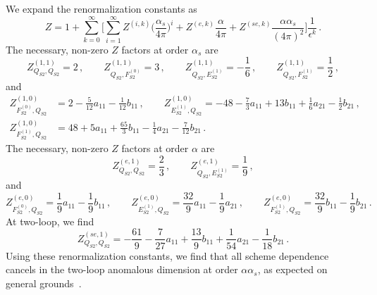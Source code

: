 \documentclass[letter,11pt,DIV=12,abstract=true,numbers=noenddot,titlepage=false,twocolumn=false,draft=false]{scrartcl}
\begin{document}
We expand the renormalization constants as
\begin{equation}
Z = 1 + \sum_{k=0}^\infty
\Bigg[ \sum_{i=1}^\infty Z^{(i,k)}
\bigg(\frac{\alpha_s}{4\pi}\bigg)^i
+ Z^{(e,k)} \frac{\alpha}{4\pi}
+ Z^{(se,k)} \frac{\alpha\alpha_s}{(4\pi)^2} \Bigg]
\frac{1}{\epsilon^k} \,.
\end{equation}
The necessary, non-zero $Z$ factors at order $\alpha_s$ are
\begin{equation}
Z_{Q_{S2}, Q_{S2}}^{(1,1)} = 2\,, \qquad
Z_{Q_{S2}, F_{S2}^{(0)}}^{(1,1)} = 3\,, \qquad
Z_{Q_{S2}, E_{S2}^{(1)}}^{(1,1)} = -\frac{1}{6}\,, \qquad
Z_{Q_{S2}, F_{S2}^{(1)}}^{(1,1)} = \frac{1}{2}\,,
\end{equation}
and
\begin{equation}
\begin{split}
Z_{F_{S2}^{(0)}, Q_{S2}}^{(1,0)} & = 2 - \frac{5}{12} a_{11} - \frac{1}{12} b_{11} \,, \qquad
Z_{E_{S2}^{(1)}, Q_{S2}}^{(1,0)} = - 48 - \frac{7}{3} a_{11} + 13 b_{11}
                                 + \frac{1}{6} a_{21} - \frac{1}{2} b_{21} \,, \\
Z_{F_{S2}^{(1)}, Q_{S2}}^{(1,0)} & = 48 + 5 a_{11} + \frac{65}{3} b_{11}
                                 - \frac{1}{4} a_{21} - \frac{7}{12} b_{21} \,.
\end{split}
\end{equation}
The necessary, non-zero $Z$ factors at order $\alpha$ are
\begin{equation}
Z_{Q_{S2}, Q_{S2}}^{(e,1)} = \frac{2}{3}\,, \qquad
Z_{Q_{S2}, E_{S2}^{(1)}}^{(e,1)} = \frac{1}{9}\,,
\end{equation}
and
\begin{equation}
Z_{F_{S2}^{(0)}, Q_{S2}}^{(e,0)} = \frac{1}{9} a_{11} - \frac{1}{9} b_{11} \,, \qquad
Z_{E_{S2}^{(1)}, Q_{S2}}^{(e,0)} = \frac{32}{9} a_{11} - \frac{1}{9} a_{21} \,, \qquad
Z_{F_{S2}^{(1)}, Q_{S2}}^{(e,0)} = \frac{32}{9} b_{11} - \frac{1}{9} b_{21} \,.
\end{equation}
At two-loop, we find
\begin{equation}
Z_{Q_{S2}, Q_{S2}}^{(se,1)} = - \frac{61}{9} - \frac{7}{27} a_{11} + \frac{13}{9} b_{11}
                       + \frac{1}{54} a_{21} - \frac{1}{18} b_{21} \,.
\end{equation}
Using these renormalization constants, we find that all scheme
dependence cancels in the two-loop anomalous dimension at order
$\alpha\alpha_s$, as expected on general grounds~\cite{Buras:1993dy}.
\end{document}
